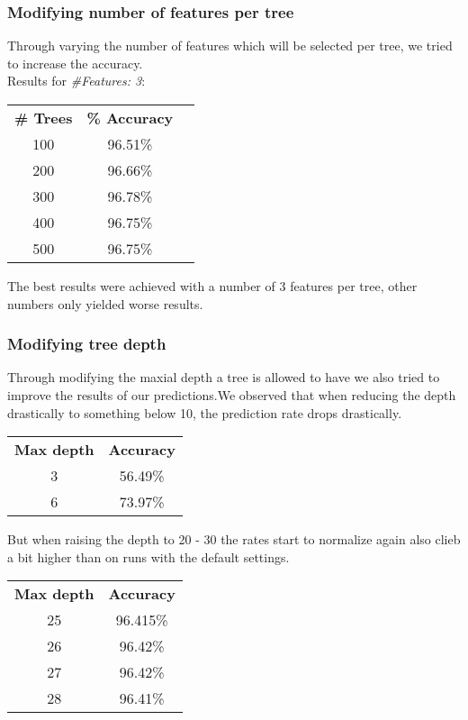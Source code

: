 \documentclass{article}
\begin{document}
\subsubsection{Modifying number of features per tree}
Through varying the number of features which will be selected per tree, we tried to increase the accuracy. \\
Results for \emph{\#Features: 3}:\\
\begin{center}
\begin{tabular}{ c | c | c }
\textbf{\# Trees} & \textbf{\% Accuracy} \\
100 & 96.51\% \\
200 & 96.66\% \\
300 & 96.78\% \\
400 & 96.75\% \\
500 & 96.75\% \\
\end{tabular}
\end{center}
The best results were achieved with a number of 3 features per tree, other numbers only yielded worse results.

\subsubsection{Modifying tree depth}
Through modifying the maxial depth a tree is allowed to have we also tried to improve the results of our predictions.We observed that when reducing the depth drastically to something below 10, the prediction rate drops drastically. 

\begin{center}

\begin{tabular}{c | c }
\textbf{Max depth} & \textbf{Accuracy}\\
3 & 56.49\%\\
6 & 73.97\%
\end{tabular}
\end{center}

But when raising the depth to 20 - 30 the rates start to normalize again also clieb a bit higher than on runs with the default settings.
\begin{center}

\begin{tabular}{c | c }
\textbf{Max depth} & \textbf{Accuracy}\\
25 & 96.415\%\\
26 & 96.42\%\\
27 & 96.42\%\\
28 & 96.41\%\\
\end{tabular}
\end{center}
\end{document}

